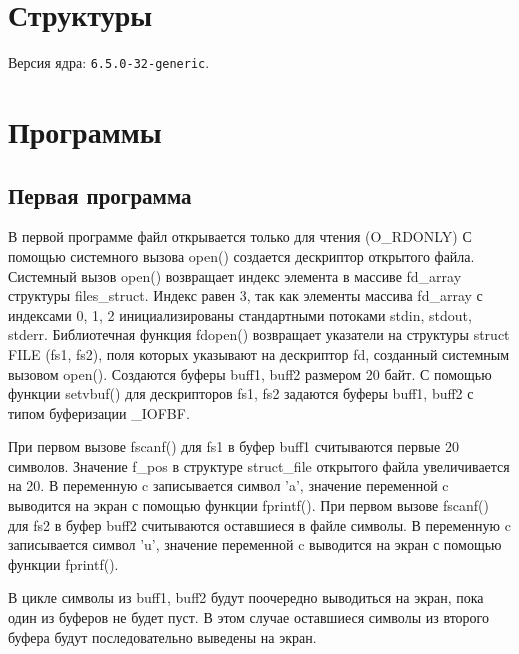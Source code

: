 \chapter{Структуры}

Версия ядра: \texttt{6.5.0-32-generic}.



\chapter{Программы}

\section{Первая программа}



В первой программе файл открывается только для чтения (O\_RDONLY)
С помощью системного вызова open() создается дескриптор открытого файла.
Системный вызов open() возвращает индекс элемента в массиве fd\_array структуры files\_struct.
Индекс равен 3, так как элементы массива fd\_array с индексами 0, 1, 2 инициализированы стандартными потоками stdin, stdout, stderr.
Библиотечная функция fdopen() возвращает указатели на структуры struct FILE (fs1, fs2), поля которых указывают на дескриптор fd, созданный системным вызовом open().
Создаются буферы buff1, buff2 размером 20 байт.
С помощью функции setvbuf() для дескрипторов fs1, fs2 задаются буферы buff1, buff2 с типом буферизации \_IOFBF.

При первом вызове fscanf() для fs1 в буфер buff1 считываются первые 20 символов.
Значение f\_pos в структуре struct\_file открытого файла увеличивается на 20.
В переменную c записывается символ 'a', значение переменной c выводится на экран с помощью функции fprintf().
При первом вызове fscanf() для fs2 в буфер buff2 считываются оставшиеся в файле символы.
В переменную c записывается символ 'u', значение переменной c выводится на экран с помощью функции fprintf().
 
В цикле символы из buff1, buff2 будут поочередно выводиться на экран, пока один из буферов не будет пуст.
В этом случае оставшиеся символы из второго буфера будут последовательно выведены на экран.

